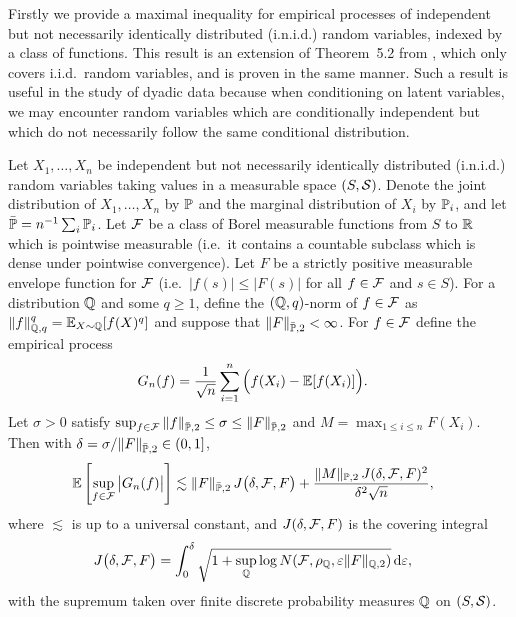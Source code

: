 Firstly we provide a maximal inequality
for empirical processes of
independent but not necessarily identically distributed
(i.n.i.d.)
random variables,
indexed by a class of functions.
This result is an extension
of Theorem~5.2 from \citet{chernozhukov2014gaussian},
which only covers i.i.d.\ random variables,
and is proven in the same manner.
Such a result is useful in the study of dyadic data
because when conditioning on latent variables,
we may encounter
random variables which are conditionally independent
but which do not necessarily follow the same
conditional distribution.

\begin{lemma}
  \label{lem:maximal_entropy}

  Let $X_1, \dots, X_n$
  be independent but not necessarily identically distributed
  (i.n.i.d.)
  random variables taking values in a
  measurable space $(S,\cS)$.
  Denote the joint distribution of
  $X_1,\ldots,X_n$ by $\P$
  and the marginal distribution of
  $X_i$ by $\P_i$,
  and let $\bar\P = n^{-1} \sum_i \P_i$.
  Let $\cF$ be a class of Borel measurable functions
  from $S$ to $\R$
  which is pointwise measurable
  (i.e.\ it contains a countable subclass which
  is dense under pointwise convergence).
  Let $F$ be a strictly positive
  measurable envelope function for $\cF$
  (i.e.\ $|f(s)| \leq |F(s)|$ for all $f \in \cF$
  and $s \in S$).
  For a distribution $\Q$ and some $q \geq 1$,
  define the $(\Q,q)$-norm of $f \in \cF$ as
  $\|f\|_{\Q,q}^q = \E_{X \sim \Q}[f(X)^q]$
  and suppose that
  $\|F\|_{\bar\P,2} < \infty$.
  For $f \in \cF$
  define the empirical process
  \begin{align*}
    G_n(f)
    &=
    \frac{1}{\sqrt n}
    \sum_{i=1}^n
    \Big(
      f(X_i) - \E[f(X_i)]
    \Big).
  \end{align*}
  Let $\sigma > 0$ satisfy
  $\sup_{f \in \cF}
  \|f\|_{\bar\P,2}
  \leq
  \sigma
  \leq
  \|F\|_{\bar\P,2}$
  and
  $M = \max_{1 \leq i \leq n} F(X_i)$.
  Then with
  $\delta = \sigma / \|F\|_{\bar\P,2} \in (0,1]$,
  \begin{align*}
    \E \left[
      \sup_{f \in \cF}
      \big| G_n(f) \big|
    \right]
    &\lesssim
    \|F\|_{\bar\P,2}
    \, J\big(\delta, \cF, F \big)
    +
    \frac{\|M\|_{\P,2} \, J(\delta, \cF, F)^2}{\delta^2 \sqrt{n}},
  \end{align*}
  where $\lesssim$ is up to a universal constant,
  and $J(\delta, \cF, F)$ is the covering integral
  \begin{align*}
    J\big(\delta, \cF, F\big)
    &=
    \int_0^\delta
    \sqrt{1 +
    \sup_\Q \log N(\cF, \rho_\Q, \varepsilon \|F\|_{\Q,2})}
    \diff{\varepsilon},
  \end{align*}
  with the supremum taken over finite discrete probability
  measures $\Q$ on $(S, \cS)$.

\end{lemma}

